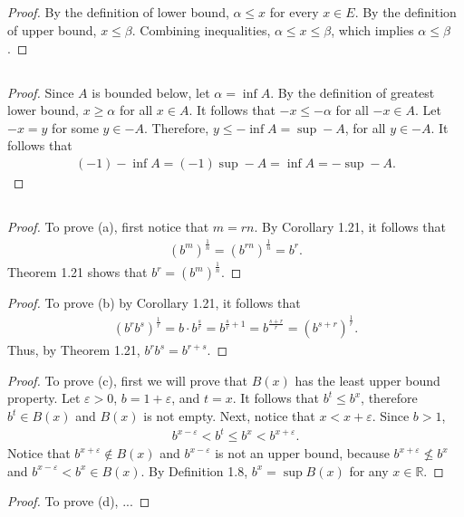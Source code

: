 \documentclass[12pt]{article}
\begin{document}
\subsection{}
\begin{proof}
				By the definition of lower bound, $\alpha\leq x$ for every $x\in E$.
				By the definition of upper bound, $x\leq\beta$. Combining inequalities, 
				$\alpha\leq x\leq\beta$, which implies $\alpha\leq\beta$.
\end{proof}
\subsection{}
\begin{proof}
				Since $A$ is bounded below, let $\alpha=\inf A$. By the definition of greatest lower bound,
				$x\geq\alpha$ for all $x\in A$. It follows that $-x\leq-\alpha$ for all $-x\in A$.
				Let $-x=y$ for some $y\in-A$. Therefore, $y\leq-\inf A=\sup -A$, for all $y\in-A$.
				It follows that
				\begin{gather*}
							(-1)-\inf A=(-1)\sup -A=\inf A=-\sup-A.
				\end{gather*}
\end{proof}
\subsection{}
\begin{proof}
				To prove (a), first notice that $m=rn$. By Corollary 1.21, it follows that
				\begin{gather*}
								(b^{m})^{\frac{1}{n}}=(b^{rn})^{\frac{1}{n}}=b^{r}.
				\end{gather*}
				Theorem 1.21 shows that $b^{r}=(b^{m})^{\frac{1}{n}}$.
\end{proof}
\begin{proof}
				To prove (b) by Corollary 1.21, it follows that
				\begin{gather*}
								(b^rb^s)^\frac{1}{r}=b\cdot b^{\frac{s}{r}}=b^{\frac{s}{r}+1}=b^{\frac{s+r}{r}}=
								(b^{s+r})^{\frac{1}{r}}.
				\end{gather*}
				Thus, by Theorem 1.21, $b^rb^s=b^{r+s}$.
\end{proof}
\begin{proof}
				To prove (c), first we will prove that $B(x)$ has the least upper bound property. Let 
				$\varepsilon>0$, $b=1+\varepsilon$, and $t=x$. It follows that $b^t\leq b^x$, therefore
				$b^t\in B(x)$ and $B(x)$ is not empty. Next, notice that $x<x+\varepsilon$. Since $b>1$,
				\begin{gather*}
								b^{x-\varepsilon}<b^t\leq b^x<b^{x+\varepsilon}. 
				\end{gather*}
				Notice that 
				$b^{x+\varepsilon}\notin B(x)$ and $b^{x-\varepsilon}$ is not an upper bound, because 
				$b^{x+\varepsilon}\nleq b^x$ and $b^{x-\varepsilon}<b^x\in B(x)$. By Definition 1.8,
				$b^x = \sup B(x)$ for any $x\in\mathbb{R}$.
\end{proof}
\begin{proof}
				To prove (d), ...
\end{proof}
\end{document}
